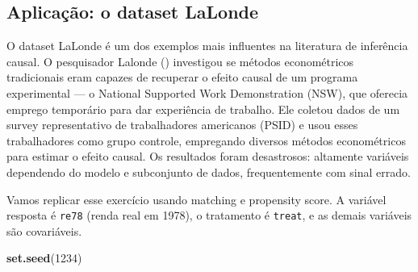 \documentclass[
]{article}
\newenvironment{Shaded}{\begin{snugshade}}{\end{snugshade}}
\newcommand{\CommentTok}[1]{\textcolor[rgb]{0.56,0.35,0.01}{\textit{#1}}}
\newcommand{\DecValTok}[1]{\textcolor[rgb]{0.00,0.00,0.81}{#1}}
\newcommand{\FunctionTok}[1]{\textcolor[rgb]{0.13,0.29,0.53}{\textbf{#1}}}
\newcommand{\NormalTok}[1]{#1}
\newcommand{\OtherTok}[1]{\textcolor[rgb]{0.56,0.35,0.01}{#1}}
\newcommand{\SpecialCharTok}[1]{\textcolor[rgb]{0.81,0.36,0.00}{\textbf{#1}}}
\newcommand{\StringTok}[1]{\textcolor[rgb]{0.31,0.60,0.02}{#1}}
\begin{document}
\subsection{Aplicação: o dataset LaLonde}\label{aplicauxe7uxe3o-o-dataset-lalonde}

O dataset LaLonde é um dos exemplos mais influentes na literatura de inferência causal. O pesquisador Lalonde () investigou se métodos econométricos tradicionais eram capazes de recuperar o efeito causal de um programa experimental --- o National Supported Work Demonstration (NSW), que oferecia emprego temporário para dar experiência de trabalho. Ele coletou dados de um survey representativo de trabalhadores americanos (PSID) e usou esses trabalhadores como grupo controle, empregando diversos métodos econométricos para estimar o efeito causal. Os resultados foram desastrosos: altamente variáveis dependendo do modelo e subconjunto de dados, frequentemente com sinal errado.

Vamos replicar esse exercício usando matching e propensity score. A variável resposta é \texttt{re78} (renda real em 1978), o tratamento é \texttt{treat}, e as demais variáveis são covariáveis.

\begin{Shaded}
\begin{Highlighting}[]
\FunctionTok{set.seed}\NormalTok{(}\DecValTok{1234}\NormalTok{)}
\end{Highlighting}
\end{Shaded}

\begin{Shaded}
\end{Shaded}
\end{document}
